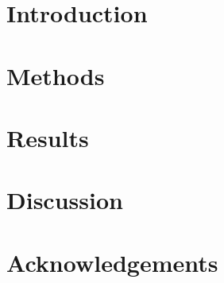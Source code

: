 



\maketitle

\begin{abstract}
\end{abstract}

\section{Introduction}

\section{Methods}

\section{Results}

\section{Discussion}

\ifanonymous\else
\section*{Acknowledgements}
\fi

\printbibliography[heading=bibnumbered, title={References}]




